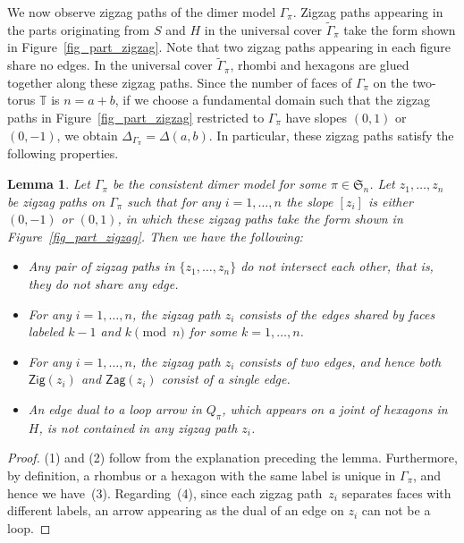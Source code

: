 \documentclass[pdftex]{sigma}
\numberwithin{equation}{section}
\newtheorem{Lemma}[Theorem]{Lemma}
\theoremstyle{definition}
\newcommand{\TT}{\mathbb{T}}
\newcommand{\fkS}{\mathfrak{S}}
\newcommand{\Zig}{\mathsf{Zig}}
\newcommand{\Zag}{\mathsf{Zag}}
\newcommand{\perm}{\pi}
\begin{document}
We now observe zigzag paths of the dimer model $\Gamma_\perm$.
Zigzag paths appearing in the parts originating from $S$ and $H$ in the universal cover $\widetilde{\Gamma}_\perm$ take the form shown in Figure~\ref{fig_part_zigzag}.
Note that two zigzag paths appearing in each figure share no edges.
In the universal cover $\widetilde{\Gamma}_\perm$, rhombi and hexagons are glued together along these zigzag paths.
Since the number of faces of $\Gamma_\perm$ on the two-torus $\TT$ is $n=a+b$,
if we choose a fundamental domain such that the zigzag paths in Figure~\ref{fig_part_zigzag} restricted to $\Gamma_\perm$ have slopes $(0,1)$ or $(0,-1)$,
we obtain $\Delta_{\Gamma_\perm}=\Delta(a,b)$. In particular, these zigzag paths satisfy the following properties.

\begin{Lemma}\label{lem_zigzag_nointersection}
Let $\Gamma_\perm$ be the consistent dimer model for some $\perm\in\fkS_n$.
Let $z_1, \dots, z_n$ be zigzag paths on $\Gamma_\perm$ such that for any $i=1, \dots, n$ the slope $[z_i]$ is either $(0,-1)$ or $(0,1)$,
in which these zigzag paths take the form shown in Figure~{\rm \ref{fig_part_zigzag}}.
Then we have the following:
\begin{itemize}\itemsep=0pt
\item[$(1)$] Any pair of zigzag paths in $\{z_1, \dots, z_n\}$ do not intersect each other, that is, they do not share any edge.
\item[$(2)$] For any $i=1, \dots, n$, the zigzag path $z_i$ consists of the edges shared by faces labeled $k-1$ and $k$$\pmod n$ for some $k=1, \dots, n$.
\item[$(3)$] For any $i=1, \dots, n$, the zigzag path $z_i$ consists of two edges, and hence both $\Zig(z_i)$ and $\Zag(z_i)$ consist of a single edge.
\item[$(4)$] An edge dual to a loop arrow in $Q_\perm$, which appears on a joint of hexagons in $H$, is not contained in any zigzag path $z_i$.
\end{itemize}
\end{Lemma}

\begin{proof}
(1) and (2) follow from the explanation preceding the lemma.
Furthermore, by definition, a rhombus or a hexagon with the same label is unique in $\Gamma_\perm$, and hence we have~(3).
Regarding~(4), since each zigzag path~$z_i$ separates faces with different labels, an arrow appearing as the dual of an edge on $z_i$ can not be a loop.
\end{proof}
\end{document}
